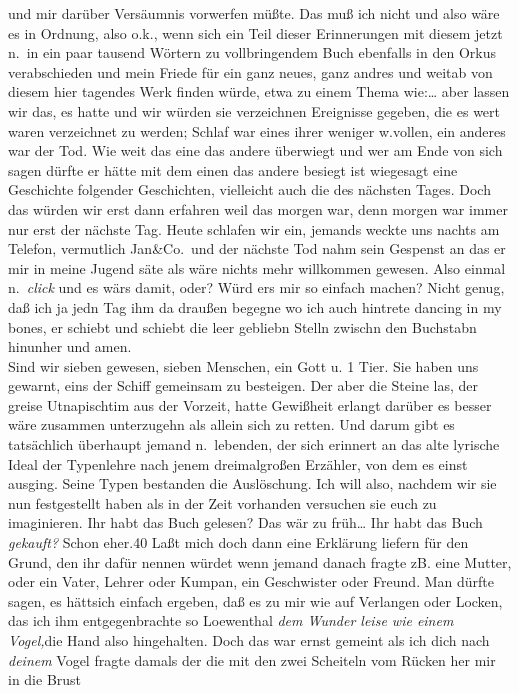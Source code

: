 \documentclass[
]{article}
\begin{document}
und mir darüber Versäumnis vorwerfen müßte. Das muß ich nicht und also
wäre es in Ordnung, also o.k., wenn sich ein Teil dieser Erinnerungen
mit diesem jetzt n.~in ein paar tausend Wörtern zu vollbringendem Buch
ebenfalls in den Orkus verabschieden und mein Friede für ein ganz neues,
ganz andres und weitab von diesem hier tagendes Werk finden würde, etwa
zu einem Thema wie:\ldots{} aber lassen wir das, es hatte und wir würden
sie verzeichnen Ereignisse gegeben, die es wert waren verzeichnet zu
werden; Schlaf war eines ihrer weniger w.vollen, ein anderes war der
Tod. Wie weit das eine das andere überwiegt und wer am Ende von sich
sagen dürfte er hätte mit dem einen das andere besiegt ist wiegesagt
eine Geschichte folgender Geschichten, vielleicht auch die des nächsten
Tages. Doch das würden wir erst dann erfahren weil das morgen war, denn
morgen war immer nur erst der nächste Tag. Heute schlafen wir ein,
jemands weckte uns nachts am Telefon, vermutlich Jan\&Co.~und der
nächste Tod nahm sein Gespenst an das er mir in meine Jugend säte als
wäre nichts mehr willkommen gewesen. Also einmal n.~\emph{click} und es
wärs damit, oder? Würd ers mir so einfach machen? Nicht genug, daß ich
ja jedn Tag ihm da draußen begegne wo ich auch hintrete dancing in my
bones, er schiebt und schiebt die leer gebliebn Stelln zwischn den
Buchstabn hinunher und amen.\\
Sind wir sieben gewesen, sieben Menschen, ein Gott u. 1 Tier. Sie haben
uns gewarnt, eins der Schiff gemeinsam zu besteigen. Der aber die Steine
las, der greise Utnapischtim aus der Vorzeit, hatte Gewißheit erlangt
darüber es besser wäre zusammen unterzugehn als allein sich zu retten.
Und darum gibt es tatsächlich überhaupt jemand n.~lebenden, der sich
erinnert an das alte lyrische Ideal der Typenlehre nach jenem
dreimalgroßen Erzähler, von dem es einst ausging. Seine Typen bestanden
die Auslöschung. Ich will also, nachdem wir sie nun festgestellt haben
als in der Zeit vorhanden versuchen sie euch zu imaginieren. Ihr habt
das Buch gelesen? Das wär zu früh\ldots{} Ihr habt das Buch
\emph{gekauft? }Schon eher.40 Laßt mich doch dann eine Erklärung liefern
für den Grund, den ihr dafür nennen würdet wenn jemand danach fragte zB.
eine Mutter, oder ein Vater, Lehrer oder Kumpan, ein Geschwister oder
Freund. Man dürfte sagen, es hättsich einfach ergeben, daß es zu mir wie
auf Verlangen oder Locken, das ich ihm entgegenbrachte so Loewenthal
\emph{dem Wunder leise wie einem Vogel,}die Hand also hingehalten. Doch
das war ernst gemeint als ich dich nach \emph{deinem} Vogel fragte
damals der die mit den zwei Scheiteln vom Rücken her mir in die Brust
\end{document}
